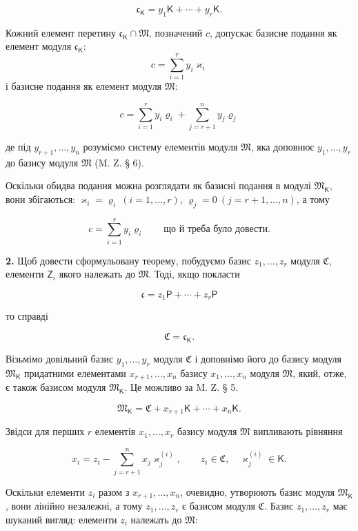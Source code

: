 \documentclass[11pt]{article}
\begin{document}
\[
\mathfrak c_{\mathsf K}=y_1\mathsf K+\cdots+y_r\mathsf K.
\]

Кожний елемент перетину \(\mathfrak c_{\mathsf K}\cap\mathfrak M\), позначений \(c\), допускає базисне подання як елемент модуля \(\mathfrak c_{\mathsf K}\):
\[
c=\sum_{i=1}^{r}y_i\varkappa_i
\]
і базисне подання як елемент модуля \(\mathfrak M\):

\[
c=\sum_{i=1}^{r}y_i\varrho_i+\sum_{j=r+1}^{n}y_j\varrho_j
\]

де під \(y_{r+1},\ldots,y_n\) розуміємо систему елементів модуля \(\mathfrak M\), яка доповнює \(y_1,\ldots,y_r\) до базису модуля \(\mathfrak M\) (M. Z. § 6).

Оскільки обидва подання можна розглядати як базисні подання в модулі \(\mathfrak M_{\mathsf K}\), вони збігаються: \(\varkappa_i=\varrho_i\ (i=1,\ldots,r)\), \(\varrho_j=0\ (j=r+1,\ldots,n)\), а тому

\[
c=\sum_{i=1}^{r}y_i\varrho_i
\qquad\text{що й треба було довести.}
\]

\textbf{2.} Щоб довести сформульовану теорему, побудуємо базис \(z_1,\ldots,z_r\) модуля \(\mathfrak C\), елементи \(\mathsf{Z}_i\) якого належать до \(\mathfrak M\). Тоді, якщо покласти

\[
\mathfrak c=z_1\mathsf P+\cdots+z_r\mathsf P
\]

то справді

\[
\mathfrak C=\mathfrak c_{\mathsf K}.
\]

Візьмімо довільний базис \(y_1,\ldots,y_r\) модуля \(\mathfrak C\) і доповнімо його до базису модуля \(\mathfrak M_{\mathsf K}\) придатними елементами \(x_{r+1},\ldots,x_n\) базису \(x_1,\ldots,x_n\) модуля \(\mathfrak M\), який, отже, є також базисом модуля \(\mathfrak M_{\mathsf K}\). Це можливо за M. Z. § 5.

\[
\mathfrak M_{\mathsf K}=\mathfrak C+x_{r+1}\mathsf K+\cdots+x_n\mathsf K.
\]

Звідси для перших \(r\) елементів \(x_1,\ldots,x_r\) базису модуля \(\mathfrak M\) випливають рівняння

\[
x_i=z_i-\sum_{j=r+1}^{n}x_j\varkappa_j^{(i)},\qquad
z_i\in\mathfrak C,\quad \varkappa_j^{(i)}\in\mathsf K.
\]

Оскільки елементи \(z_i\) разом з \(x_{r+1},\ldots,x_n\), очевидно, утворюють базис модуля \(\mathfrak M_{\mathsf K}\), вони лінійно незалежні, а тому \(z_1,\ldots,z_r\) є базисом модуля \(\mathfrak C\). Базис \(z_1,\ldots,z_r\) має шуканий вигляд: елементи \(z_i\) належать до \(\mathfrak M\):
\end{document}
